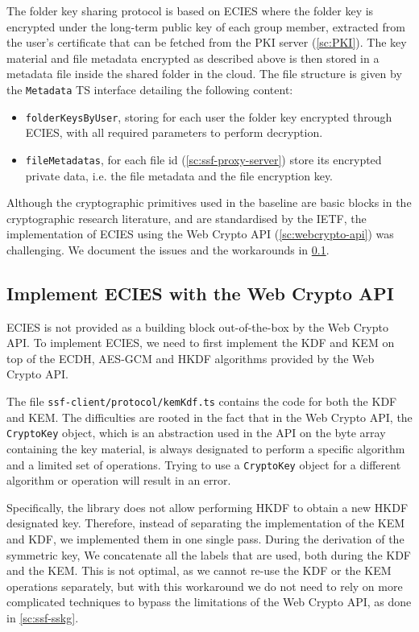The folder key sharing protocol is based on ECIES where the folder key
is encrypted under the long-term public key of each group member,
extracted from the user's certificate that can be fetched
from the PKI server (\cref{sc:PKI}).
The key material and file metadata encrypted as described above is
then stored in a metadata file inside the shared folder in the cloud.
The file structure is given by the \texttt{Metadata} TS interface
detailing the following content:
\begin{itemize}
    \item \texttt{folderKeysByUser}, storing for each user the folder key encrypted through ECIES, with all required parameters to perform decryption.
    \item \texttt{fileMetadatas}, for each file id (\cref{sc:ssf-proxy-server}) store its encrypted private data, i.e. the file metadata and the file encryption key.
\end{itemize}

Although the cryptographic primitives used in the baseline are
basic blocks in the cryptographic research literature,
and are standardised by the IETF, the implementation of
ECIES using the Web Crypto API (\cref{sc:webcrypto-api}) was challenging.
We document the issues and the workarounds in \cref{sc:implement-ecies}.

\subsection{Implement ECIES with the Web Crypto API}\label{sc:implement-ecies}

ECIES is not provided as a building block out-of-the-box by the Web Crypto API.
To implement ECIES, we need to first implement 
the KDF and KEM on top of the ECDH, AES-GCM and HKDF algorithms provided
by the Web Crypto API.

The file \texttt{ssf-client/protocol/kemKdf.ts} contains the code for both the KDF and KEM.
The difficulties are rooted in the fact that
in the Web Crypto API, the \texttt{CryptoKey}
object, which is an abstraction used in the API on the byte array containing the key material,
is always designated to perform a specific algorithm and
a limited set of operations.
Trying to use a \texttt{CryptoKey} object for a different algorithm or operation
will result in an error.

Specifically, the library does not allow performing 
HKDF to obtain a new HKDF designated key.
Therefore, instead of separating the implementation
of the KEM and KDF, we implemented them in one single pass.
During the derivation of the symmetric key,
We concatenate all the labels that are used, both
during the KDF and the KEM. This is not optimal,
as we cannot re-use the KDF or the KEM operations
separately, but with this workaround we do not need
to rely on more complicated techniques 
to bypass the limitations of the Web Crypto API,
as done in \cref{sc:ssf-sskg}.

